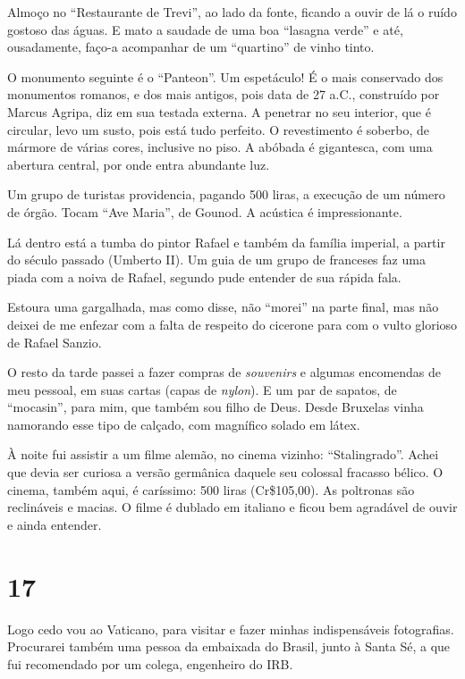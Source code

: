 Almoço no ``Restaurante de Trevi'', ao lado da fonte, ficando a ouvir de lá o ruído gostoso das águas. E mato a saudade de uma boa ``lasagna verde'' e até, ousadamente, faço-a acompanhar de um ``quartino'' de vinho tinto.

O monumento seguinte é o ``Panteon''. Um espetáculo! É o mais conservado dos monumentos romanos, e dos mais antigos, pois data de 27 a.C., construído por Marcus Agripa, diz em sua testada externa. A penetrar no seu interior, que é circular, levo um susto, pois está tudo perfeito. O revestimento é soberbo, de mármore de várias cores, inclusive no piso. A abóbada é gigantesca, com uma abertura central, por onde entra abundante luz.

Um grupo de turistas providencia, pagando 500 liras, a execução de um número de órgão. Tocam ``Ave Maria'', de Gounod. A acústica é impressionante.

Lá dentro está a tumba do pintor Rafael e também da família imperial, a partir do século passado (Umberto II). Um guia de um grupo de franceses faz uma piada com a noiva de Rafael, segundo pude entender de sua rápida fala.

Estoura uma gargalhada, mas como disse, não ``morei'' na parte final, mas não deixei de me enfezar com a falta de respeito do cicerone para com o vulto glorioso de Rafael Sanzio.

O resto da tarde passei a fazer compras de \textit{souvenirs} e algumas encomendas de meu pessoal, em suas cartas (capas de \textit{nylon}). E um par de sapatos, de ``mocasin'', para mim, que também sou filho de Deus. Desde Bruxelas vinha namorando esse tipo de calçado, com magnífico solado em látex.

À noite fui assistir a um filme alemão, no cinema vizinho: ``Stalingrado''. Achei que devia ser curiosa a versão germânica daquele seu colossal fracasso bélico. O cinema, também aqui, é caríssimo: 500 liras (Cr\$105,00). As poltronas são reclináveis e macias. O filme é dublado em italiano e ficou bem agradável de ouvir e ainda entender.

\section*{17 \adfflatleafright {}}
Logo cedo vou ao Vaticano, para visitar e fazer minhas indispensáveis fotografias. Procurarei também uma pessoa da embaixada do Brasil, junto à Santa Sé, a que fui recomendado por um colega, engenheiro do IRB.

